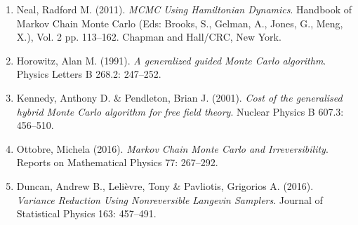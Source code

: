 \documentclass[12pt,lettersize,oneside]{book} %
\begin{document}
\begin{talk}
\medskip

\begin{enumerate}
 \item[{[1]}] Neal, Radford M. (2011). {\it MCMC Using Hamiltonian Dynamics}. Handbook of Markov Chain Monte Carlo (Eds: Brooks, S., Gelman, A., Jones, G., Meng, X.), Vol. 2 pp. 113--162. Chapman and Hall/CRC, New York.
 \item[{[2]}] Horowitz, Alan M. (1991). {\it A generalized guided Monte Carlo algorithm}. Physics Letters B 268.2: 247--252. 
 \item[{[3]}] Kennedy, Anthony D. \& Pendleton, Brian J. (2001). {\it Cost of the generalised hybrid Monte Carlo algorithm for free field theory}. Nuclear Physics B 607.3: 456--510.
 \item[{[4]}] Ottobre, Michela (2016). {\it Markov Chain Monte Carlo and Irreversibility}. Reports on Mathematical Physics 77: 267--292.
 \item[{[5]}] Duncan, Andrew B., Leli\`evre, Tony \& Pavliotis, Grigorios A. (2016). {\it Variance Reduction Using Nonreversible Langevin Samplers}. Journal of Statistical Physics 163: 457--491. 
\end{enumerate}

\end{talk}
\end{document}
